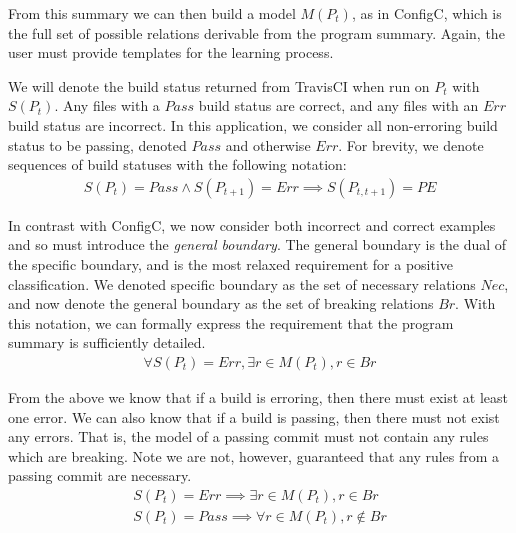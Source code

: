 From this summary we can then build a model $M(P_t)$, as in ConfigC, which is the full set of possible relations derivable from the program summary.
Again, the user must provide templates for the learning process.

We will denote the build status returned from TravisCI when run on $P_t$ with $S(P_t)$.
Any files with a $Pass$ build status are correct, and any files with an $Err$ build status are incorrect.
In this application, we consider all non-erroring build status to be passing, denoted $Pass$ and otherwise $Err$.
For brevity, we denote sequences of build statuses with the following notation:
\begin{align*}
  S(P_t)=Pass \land S(P_{t+1})=Err \implies S(P_{t,t+1}) = PE
\end{align*}

In contrast with ConfigC, we now consider both incorrect and correct examples and so must introduce the \textit{general boundary}.
The general boundary is the dual of the specific boundary, and is the most relaxed requirement for a positive classification.
We denoted specific boundary as the set of necessary relations $Nec$, and now denote the general boundary as the set of breaking relations $Br$.
With this notation, we can formally express the requirement that the program summary is sufficiently detailed.
\begin{align}
  \forall S(P_t)=Err, \exists r \in M(P_t), r \in Br \label{eq:E1}
\end{align}

From the above we know that if a build is erroring, then there must exist at least one error.
We can also know that if a build is passing, then there must not exist any errors.
That is, the model of a passing commit must not contain any rules which are breaking.
Note we are not, however, guaranteed that any rules from a passing commit are necessary.
\begin{align}
  S(P_t) = Err \implies \exists r \in  M (P_t), r \in Br \label{eq:E}\\
  S(P_t) = Pass \implies \forall r \in  M (P_t), r \notin Br \label{eq:P}
\end{align}

